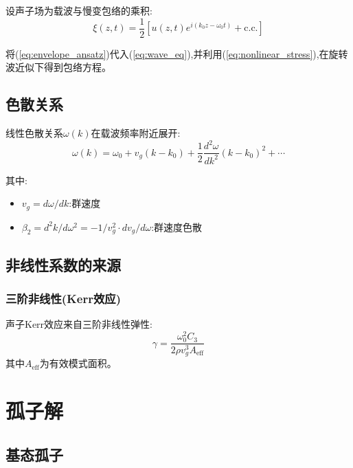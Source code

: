 \documentclass[12pt,a4paper]{article}
\theoremstyle{definition}
\begin{document}
设声子场为载波与慢变包络的乘积:
\begin{equation}
\xi(z,t)=\frac{1}{2}\left[u(z,t)e^{i(k_0z-\omega_0t)}+\text{c.c.}\right]
\label{eq:envelope_ansatz}
\end{equation}

将(\ref{eq:envelope_ansatz})代入(\ref{eq:wave_eq}),并利用(\ref{eq:nonlinear_stress}),在旋转波近似下得到包络方程。

\subsection{色散关系}

线性色散关系$\omega(k)$在载波频率附近展开:
\begin{equation}
\omega(k)=\omega_0+v_g(k-k_0)+\frac{1}{2}\frac{d^2\omega}{dk^2}(k-k_0)^2+\cdots
\label{eq:dispersion_expansion}
\end{equation}

其中:
\begin{itemize}
    \item $v_g=d\omega/dk$:群速度
    \item $\beta_2=d^2k/d\omega^2=-1/v_g^2\cdot dv_g/d\omega$:群速度色散
\end{itemize}

\subsection{非线性系数的来源}

\subsubsection{三阶非线性(Kerr效应)}

声子Kerr效应来自三阶非线性弹性:
\begin{equation}
\gamma=\frac{\omega_0^2C_3}{2\rho v_g^3A_{\text{eff}}}
\label{eq:nonlinear_coefficient}
\end{equation}
其中$A_{\text{eff}}$为有效模式面积。

\section{孤子解}

\subsection{基态孤子}
\end{document}

